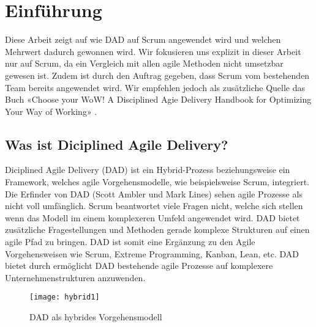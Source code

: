 
\chapter{Einführung}
\thispagestyle{fancy}
Diese Arbeit zeigt auf wie DAD auf Scrum angewendet wird und welchen Mehrwert dadurch gewonnen wird. Wir fokusieren uns explizit in dieser Arbeit nur auf Scrum, da ein Vergleich mit allen agile Methoden nicht umsetzbar gewesen ist. Zudem ist durch den Auftrag gegeben, dass Scrum vom bestehenden Team bereits angewendet wird.\smallskip
Wir empfehlen jedoch als zusätzliche Quelle das Buch «Choose your WoW! A Disciplined Agie Delivery Handbook for Optimizing Your Way of Working» \cite{dadHandbook}.

\section{Was ist Diciplined Agile Delivery?}

Diciplined Agile Delivery (DAD) ist ein Hybrid-Prozess beziehungsweise ein Framework, welches agile Vorgehensmodelle, wie beispielsweise Scrum, integriert. Die Erfinder von DAD (Scott Ambler und Mark Lines) sehen agile Prozesse als nicht voll umfänglich. Scrum beantwortet viele Fragen nicht, welche sich stellen wenn das Modell im einem komplexeren Umfeld angewendet wird. DAD bietet zusätzliche Fragestellungen und Methoden gerade komplexe Strukturen auf einen agile Pfad zu bringen. DAD ist somit eine Ergänzung zu den Agile Vorgehensweisen wie Scrum, Extreme Programming, Kanban, Lean, etc. DAD bietet durch ermöglicht DAD bestehende agile Prozesse auf komplexere Unternehmenstrukturen anzuwenden.\newline

\begin{figure}[H]
	\centering
	\texttt{[image: hybrid1]}
	\caption{DAD als hybrides Vorgehensmodell \cite{dadHybrid}}
	\label{fig:hybrid}
\end{figure}
